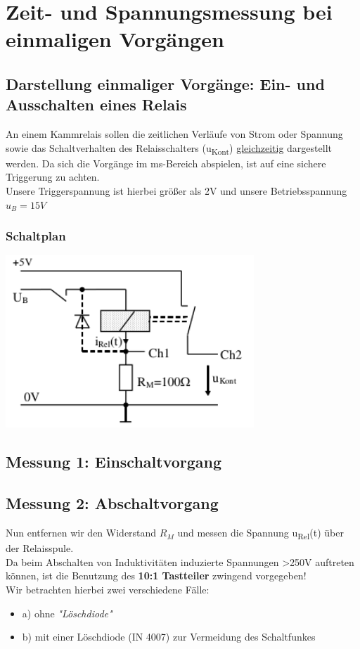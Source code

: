 \documentclass[11pt,a4paper,titlepage]{article}
\begin{document}
\newpage

\section{Zeit- und Spannungsmessung bei einmaligen Vorg\"angen}

\subsection{Darstellung einmaliger Vorg\"ange: Ein- und Ausschalten eines Relais}
An einem Kammrelais sollen die zeitlichen Verl\"aufe von Strom oder Spannung sowie das Schaltverhalten des Relaisschalters (u\textsubscript{Kont}) \underline{gleichzeitig} dargestellt werden. Da sich die Vorg\"ange im  ms-Bereich abspielen, ist auf eine sichere Triggerung zu achten. \\
Unsere Triggerspannung ist hierbei gr\"o\ss{}er als 2V und unsere Betriebsspannung $u_B=15V$\\[1ex]

\subsubsection{Schaltplan}
\begin{center}
  \includegraphics[width=0.7\textwidth]{schaltplan_2_1}
\end{center}

\subsection{Messung 1: Einschaltvorgang}

\newpage

\subsection{Messung 2: Abschaltvorgang}
Nun entfernen wir den Widerstand $R_M$ und messen die Spannung u\textsubscript{Rel}(t) \"uber der Relaisspule. \\
Da beim Abschalten von Induktivit\"aten induzierte Spannungen \textgreater250V auftreten k\"onnen, ist die Benutzung des \textbf{10:1 Tastteiler} zwingend vorgegeben!\\
Wir betrachten hierbei zwei verschiedene Fälle:\\
\begin{itemize}
\item a) ohne \textit{"L\"oschdiode"}
\item b) mit einer L\"oschdiode (IN 4007) zur Vermeidung des Schaltfunkes
\end{itemize}
\end{document}
